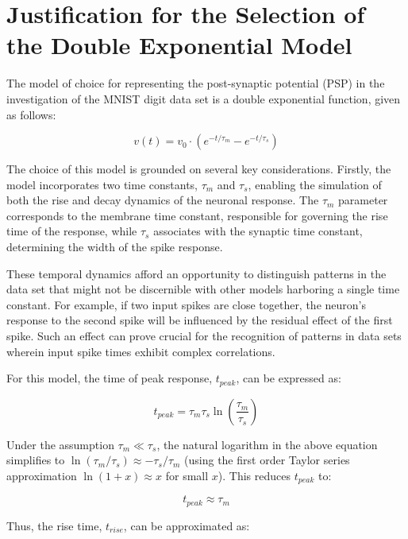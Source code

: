 \section{Justification for the Selection of the Double Exponential Model}

The model of choice for representing the post-synaptic potential (PSP) in the investigation of the MNIST digit data set is a double exponential function, given as follows:

\begin{equation}
    v(t) = v_0 \cdot (e^{-t/\tau_m} - e^{-t/\tau_s})
\end{equation}

The choice of this model is grounded on several key considerations. Firstly, the model incorporates two time constants, $\tau_m$ and $\tau_s$, enabling the simulation of both the rise and decay dynamics of the neuronal response. The $\tau_m$ parameter corresponds to the membrane time constant, responsible for governing the rise time of the response, while $\tau_s$ associates with the synaptic time constant, determining the width of the spike response.

These temporal dynamics afford an opportunity to distinguish patterns in the data set that might not be discernible with other models harboring a single time constant. For example, if two input spikes are close together, the neuron's response to the second spike will be influenced by the residual effect of the first spike. Such an effect can prove crucial for the recognition of patterns in data sets wherein input spike times exhibit complex correlations.

For this model, the time of peak response, $t_{peak}$, can be expressed as:

\begin{equation}
t_{peak} = \tau_m \tau_s \ln\left(\frac{\tau_m}{\tau_s}\right)
\end{equation}

Under the assumption $\tau_m \ll \tau_s$, the natural logarithm in the above equation simplifies to $\ln(\tau_m/\tau_s) \approx -\tau_s/\tau_m$ (using the first order Taylor series approximation $\ln(1+x) \approx x$ for small $x$). This reduces $t_{peak}$ to:

\begin{equation}
t_{peak} \approx \tau_m
\end{equation}

Thus, the rise time, $t_{rise}$, can be approximated as:

